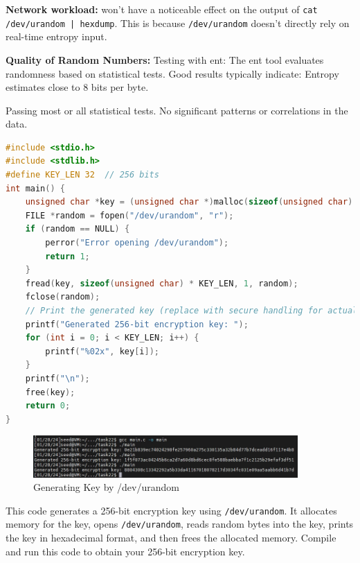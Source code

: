 \documentclass[a4paper,11pt]{article}
\begin{document}
\textbf{Network workload:} won't have a noticeable effect on the output of \verb!cat /dev/urandom | hexdump!. This is because \verb|/dev/urandom| doesn't directly rely on real-time entropy input.

\textbf{Quality of Random Numbers:}
Testing with ent: The ent tool evaluates randomness based on statistical tests. Good results typically indicate: Entropy estimates close to 8 bits per byte.

Passing most or all statistical tests.
No significant patterns or correlations in the data.

\begin{lstlisting}[caption={C Program Code for Generating Keys by /dev/urandom},label={lst:task22},language=C,breaklines=true]
#include <stdio.h>
#include <stdlib.h>
#define KEY_LEN 32  // 256 bits
int main() {
    unsigned char *key = (unsigned char *)malloc(sizeof(unsigned char) * KEY_LEN);
    FILE *random = fopen("/dev/urandom", "r");
    if (random == NULL) {
        perror("Error opening /dev/urandom");
        return 1;
    }
    fread(key, sizeof(unsigned char) * KEY_LEN, 1, random);
    fclose(random);
    // Print the generated key (replace with secure handling for actual use):
    printf("Generated 256-bit encryption key: ");
    for (int i = 0; i < KEY_LEN; i++) {
        printf("%02x", key[i]);
    }
    printf("\n");
    free(key);
    return 0;
}

\end{lstlisting} 

\begin{figure}[h]
    \centering
       \includegraphics[width=0.9\textwidth]{figures/task22/watch3.png}
    \caption{Generating Key by /dev/urandom}\label{fig:task22observation-3}
\end{figure}
This code generates a 256-bit encryption key using \verb|/dev/urandom|. It allocates memory for the key, opens \verb|/dev/urandom|, reads random bytes into the key, prints the key in hexadecimal format, and then frees the allocated memory. Compile and run this code to obtain your 256-bit encryption key.


%
\end{document}
